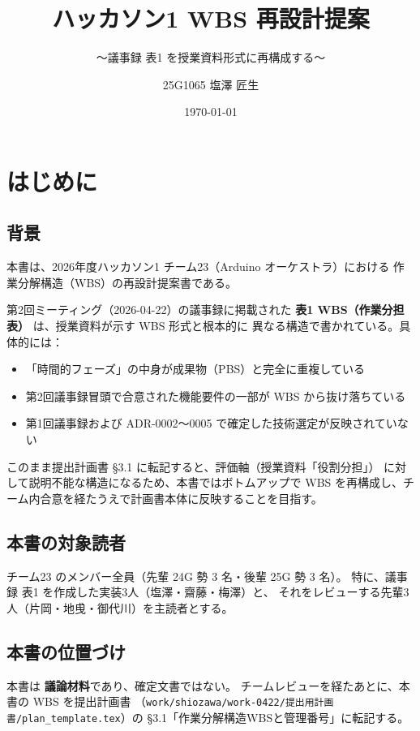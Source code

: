 \documentclass[lualatex,book,paper=a4paper,jafontsize=11pt,jafontscale=1.05]{jlreq}
\title{ハッカソン1 WBS 再設計提案}
\subtitle{～議事録 表1 を授業資料形式に再構成する～}
\author{25G1065 塩澤 匠生}
\date{\today}
\begin{document}
\maketitle

\setcounter{tocdepth}{2}
\tableofcontents \thispagestyle{empty}

\chapter{はじめに}\setcounter{page}{1}

\section{背景}

本書は、2026年度ハッカソン1 チーム23（Arduino オーケストラ）における
作業分解構造（WBS）の再設計提案書である。

第2回ミーティング（2026-04-22）の議事録に掲載された
\textbf{表1 WBS（作業分担表）} は、授業資料が示す WBS 形式と根本的に
異なる構造で書かれている。具体的には：

\begin{itemize}
  \item 「時間的フェーズ」の中身が成果物（PBS）と完全に重複している
  \item 第2回議事録冒頭で合意された機能要件の一部が WBS から抜け落ちている
  \item 第1回議事録および ADR-0002〜0005 で確定した技術選定が反映されていない
\end{itemize}

このまま提出計画書 §3.1 に転記すると、評価軸（授業資料「役割分担」）
に対して説明不能な構造になるため、本書ではボトムアップで
WBS を再構成し、チーム内合意を経たうえで計画書本体に反映することを目指す。

\section{本書の対象読者}

チーム23 のメンバー全員（先輩 24G 勢 3 名・後輩 25G 勢 3 名）。
特に、議事録 表1 を作成した実装3人（塩澤・齋藤・梅澤）と、
それをレビューする先輩3人（片岡・地曵・御代川）を主読者とする。

\section{本書の位置づけ}

本書は \textbf{議論材料}であり、確定文書ではない。
チームレビューを経たあとに、本書の WBS を提出計画書
（\texttt{work/shiozawa/work-0422/提出用計画書/plan\_template.tex}）の
§3.1「作業分解構造WBSと管理番号」に転記する。
\end{document}
